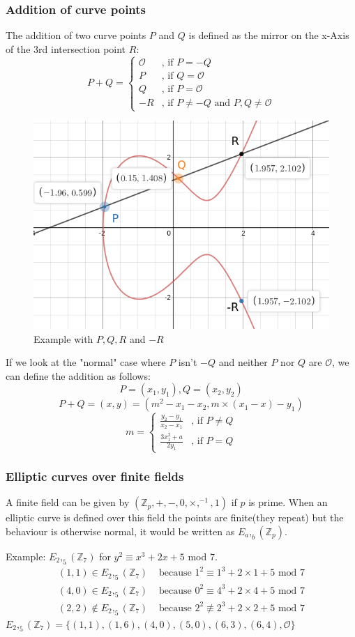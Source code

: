 \documentclass[a4paper,12pt]{scrartcl}
\begin{document}
\subsubsection{Addition of curve points}
The addition of two curve points $P$ and $Q$ is defined as the mirror on the x-Axis of the 3rd intersection point $R$:
\[
P+Q =
\begin{cases}
\mathcal{O} & \text{, if } P = -Q \\
P & \text{, if } Q = \mathcal{O} \\
Q & \text{, if } P = \mathcal{O} \\
-R & \text{, if } P \neq -Q \text{ and } P,Q \neq \mathcal{O}
\end{cases}
\]

\begin{figure}[hb!]
	\centering
	\includegraphics[width=0.5\linewidth]{ec2}
	\caption[]{Example with $P, Q, R$ and $-R$}
\end{figure}

If we look at the "normal" case where $P$ isn't $-Q$ and neither $P$ nor $Q$ are $\mathcal{O}$, we can define the addition as follows:
\[ P = (x_1,y_1), Q = (x_2,y_2) \]
\[ P + Q = (x,y) = (m^2 - x_1 -x_2, m \times (x_1 - x) - y_1) \]
\[ m =
\begin{cases}
\frac{y_2 - y_1}{x_2 - x_1}
& \text{, if } P \neq Q \\
\frac{3x_1^2 + a}{2y_1}
& \text{, if } P = Q
\end{cases}
\]

\subsubsection{Elliptic curves over finite fields}
A finite field can be given by $(\mathbb{Z}_p,+,-,0,\times,^{-1},1)$ if $p$ is prime. When an elliptic curve is defined over this field the points are finite(they repeat) but the behaviour is otherwise normal, it would be written as $E_a,_b (\mathbb{Z}_p)$.

Example: $E_2,_5 (\mathbb{Z}_7)$ for $y^2 \equiv x^3 + 2x + 5$ mod $7$.
\begin{align}
(1,1) \in E_2,_5 (\mathbb{Z}_7) & \text{ because } 1^2 \equiv 1^3 + 2\times{1} + 5 \text{ mod } 7 \\
(4,0) \in E_2,_5 (\mathbb{Z}_7) & \text{ because } 0^2 \equiv 4^3 + 2\times{4} + 5 \text{ mod } 7 \\
(2,2) \notin E_2,_5 (\mathbb{Z}_7) & \text{ because } 2^2 \not \equiv 2^3 + 2\times{2} + 5 \text{ mod } 7 
\end{align}
$E_2,_5 (\mathbb{Z}_7) = \{ (1,1),(1,6),(4,0),(5,0),(6,3),(6,4), \mathcal{O} \}$
\end{document}
